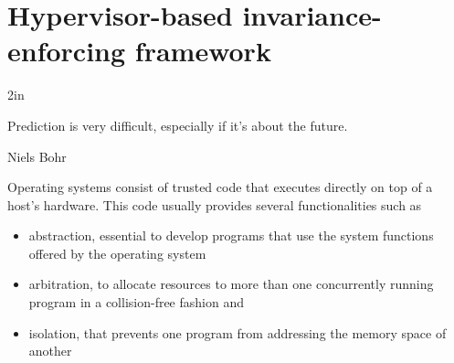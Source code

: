 \chapter{Hypervisor-based invariance-enforcing framework} \label{hellorootkitty}

\epigraph{2in}{Prediction is very difficult, especially if it's about the future.}{Niels Bohr}{}


Operating systems consist of trusted code that executes directly on top of a host's hardware. This code usually provides several functionalities \cite{stallings} such as 

\begin{itemize}
\item abstraction, essential to develop programs that use the system functions offered by the operating system 
\item arbitration, to allocate resources to more than one concurrently running program in a collision-free fashion and 
\item isolation, that prevents one program from addressing the memory space of another
\end{itemize}


